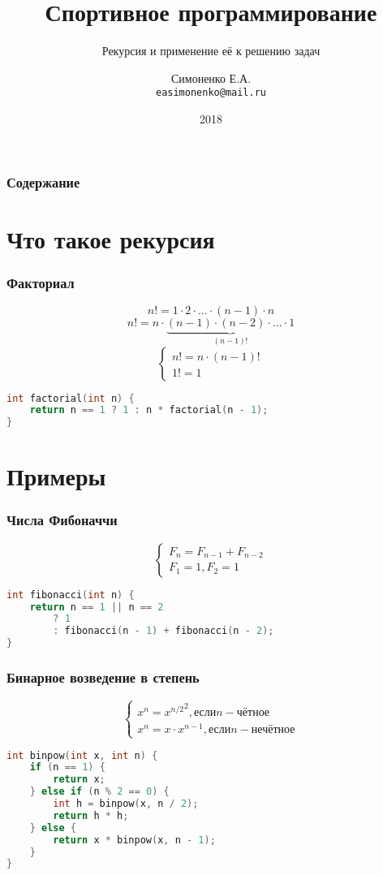 \documentclass[11pt]{beamer}
\begin{document}
\author{Симоненко Е.А. \\ \texttt{easimonenko@mail.ru}}
\title{Спортивное программирование}
\subtitle{Рекурсия и применение её к решению задач}
\date{2018}

\begin{frame}
\titlepage
\end{frame}

\begin{frame}
\frametitle{Содержание}
\tableofcontents
\end{frame}

\section{Что такое рекурсия}

\begin{frame}[fragile]
\frametitle{Факториал}
\[n! = 1 \cdot 2 \cdot ... \cdot (n - 1) \cdot n\]
\[n! = n \cdot \underbrace{(n - 1) \cdot (n - 2) \cdot ... \cdot 1}_{(n - 1)!}\]
\[ \left\{
\begin{array}{l}
n! = n \cdot (n - 1)! \\
1! = 1
\end{array}
\right. \]
\begin{lstlisting}[frame=single,language=c]
int factorial(int n) {
    return n == 1 ? 1 : n * factorial(n - 1);
}
\end{lstlisting}
\end{frame}

\section{Примеры}

\begin{frame}[fragile]
\frametitle{Числа Фибоначчи}
\[\left\{
\begin{array}{l}
F_n = F_{n - 1} + F_{n - 2} \\
F_1 = 1, F_2 = 1
\end{array}
\right.\]
\begin{lstlisting}[frame=single,language=c]
int fibonacci(int n) {
    return n == 1 || n == 2
        ? 1
        : fibonacci(n - 1) + fibonacci(n - 2);
}
\end{lstlisting}
\end{frame}

\begin{frame}[fragile]
\frametitle{Бинарное возведение в степень}
\[\left\{
\begin{array}{l}
x^n = {x^{n / 2}}^2, \text{если} n - \text{чётное} \\
x^n = x \cdot x^{n - 1}, \text{если} n - \text{нечётное}
\end{array}
\right.\]
\begin{lstlisting}[frame=single,language=c]
int binpow(int x, int n) {
    if (n == 1) {
        return x;
    } else if (n % 2 == 0) {
        int h = binpow(x, n / 2);
        return h * h;
    } else {
        return x * binpow(x, n - 1);
    }
}
\end{lstlisting}
\end{frame}
\end{document}
